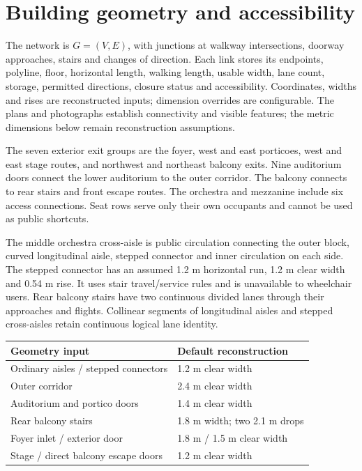 \documentclass[11pt,a4paper]{article}
\begin{document}
\section{Building geometry and accessibility}
The network is $G=(V,E)$, with junctions at walkway intersections, doorway approaches, stairs and changes of direction. Each link stores its endpoints, polyline, floor, horizontal length, walking length, usable width, lane count, storage, permitted directions, closure status and accessibility. Coordinates, widths and rises are reconstructed inputs; dimension overrides are configurable. The plans and photographs establish connectivity and visible features; the metric dimensions below remain reconstruction assumptions.~\cite{brief,plans,model}

The seven exterior exit groups are the foyer, west and east porticoes, west and east stage routes, and northwest and northeast balcony exits. Nine auditorium doors connect the lower auditorium to the outer corridor. The balcony connects to rear stairs and front escape routes. The orchestra and mezzanine include six access connections. Seat rows serve only their own occupants and cannot be used as public shortcuts.

The middle orchestra cross-aisle is public circulation connecting the outer block, curved longitudinal aisle, stepped connector and inner circulation on each side. The stepped connector has an assumed 1.2 m horizontal run, 1.2 m clear width and 0.54 m rise. It uses stair travel/service rules and is unavailable to wheelchair users. Rear balcony stairs have two continuous divided lanes through their approaches and flights. Collinear segments of longitudinal aisles and stepped cross-aisles retain continuous logical lane identity.

\begin{center}\small
\begin{tabularx}{\linewidth}{Xl}\toprule
Geometry input & Default reconstruction\\\midrule
Ordinary aisles / stepped connectors & 1.2 m clear width\\
Outer corridor & 2.4 m clear width\\
Auditorium and portico doors & 1.4 m clear width\\
Rear balcony stairs & 1.8 m width; two 2.1 m drops\\
Foyer inlet / exterior door & 1.8 m / 1.5 m clear width\\
Stage / direct balcony escape doors & 1.2 m clear width\\\bottomrule
\end{tabularx}
\end{center}
\end{document}
